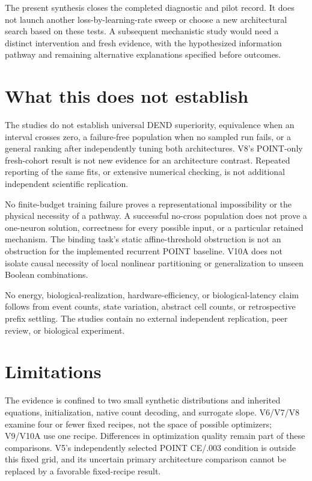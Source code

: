 \documentclass[
  10pt,
]{article}
\begin{document}
The present synthesis closes the completed diagnostic and pilot record.
It does not launch another loss-by-learning-rate sweep or choose a new
architectural search based on these tests. A subsequent mechanistic
study would need a distinct intervention and fresh evidence, with the
hypothesized information pathway and remaining alternative explanations
specified before outcomes.

\section{What this does not
establish}\label{what-this-does-not-establish}

The studies do not establish universal DEND superiority, equivalence
when an interval crosses zero, a failure-free population when no sampled
run fails, or a general ranking after independently tuning both
architectures. V8's POINT-only fresh-cohort result is not new evidence
for an architecture contrast. Repeated reporting of the same fits, or
extensive numerical checking, is not additional independent scientific
replication.

No finite-budget training failure proves a representational
impossibility or the physical necessity of a pathway. A successful
no-cross population does not prove a one-neuron solution, correctness
for every possible input, or a particular retained mechanism. The
binding task's static affine-threshold obstruction is not an obstruction
for the implemented recurrent POINT baseline. V10A does not isolate
causal necessity of local nonlinear partitioning or generalization to
unseen Boolean combinations.

No energy, biological-realization, hardware-efficiency, or
biological-latency claim follows from event counts, state variation,
abstract cell counts, or retrospective prefix settling. The studies
contain no external independent replication, peer review, or biological
experiment.

\section{Limitations}\label{limitations}

The evidence is confined to two small synthetic distributions and
inherited equations, initialization, native count decoding, and
surrogate slope. V6/V7/V8 examine four or fewer fixed recipes, not the
space of possible optimizers; V9/V10A use one recipe. Differences in
optimization quality remain part of these comparisons. V5's
independently selected POINT CE/.003 condition is outside this fixed
grid, and its uncertain primary architecture comparison cannot be
replaced by a favorable fixed-recipe result.
\end{document}
